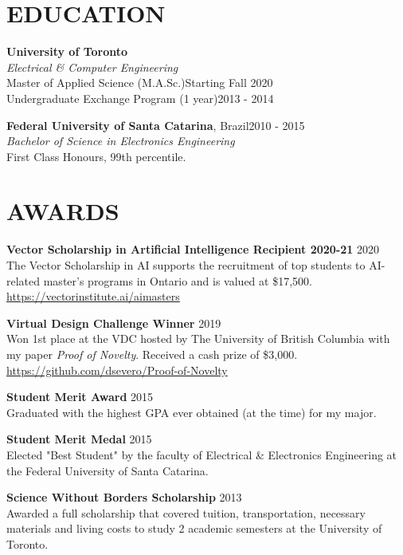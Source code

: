 \documentclass[margin, line]{res}
\begin{document}
\address{\textbf{For more information}: \url{https://dsevero.com}}
\begin{resume}

\section{EDUCATION}
\textbf{University of Toronto}\\
{\sl Electrical \& Computer Engineering}\\
Master of Applied Science (M.A.Sc.)\hfill Starting Fall 2020\\
Undergraduate Exchange Program (1 year)\hfill 2013 - 2014

\textbf{Federal University of Santa Catarina}, Brazil\hfill 2010 - 2015 \\
{\sl Bachelor of Science in Electronics Engineering}\\
First Class Honours, 99th percentile.

\section{AWARDS}
\textbf{Vector Scholarship in Artificial Intelligence Recipient 2020-21} \hfill 2020\\
The Vector Scholarship in AI supports the recruitment of top students to AI-related master’s programs in Ontario and is valued at \$17,500.\\
\url{https://vectorinstitute.ai/aimasters}

\textbf{Virtual Design Challenge Winner} \hfill 2019\\
Won 1st place at the VDC hosted by The University of British Columbia with my paper \emph{Proof of Novelty}. Received a cash prize of \$3,000.\\
\url{https://github.com/dsevero/Proof-of-Novelty}

\textbf{Student Merit Award} \hfill 2015\\
Graduated with the highest GPA ever obtained (at the time) for my major.

\textbf{Student Merit Medal} \hfill 2015\\
Elected "Best Student" by the faculty of Electrical \& Electronics Engineering at the Federal University of Santa Catarina.

\textbf{Science Without Borders Scholarship} \hfill 2013\\
Awarded a full scholarship that covered tuition, transportation, necessary materials and living costs to study 2 academic semesters at the University of Toronto.


\end{resume}
\end{document}
